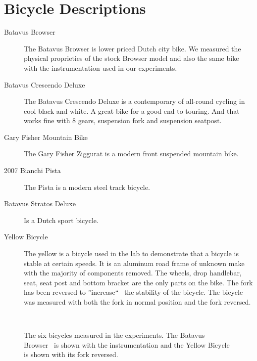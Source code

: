\documentclass{bmd2010p}
\begin{document}
\section{Bicycle Descriptions}
\begin{description}
    \item[Batavus Browser]{The Batavus Browser is lower priced Dutch city bike.
        We measured the physical proprieties of the stock Browser model and
        also the same bike with the instrumentation used in our experiments.}
    \item[Batavus Crescendo Deluxe]{The Batavus Crescendo Deluxe is a
        contemporary of all-round cycling in cool black and white. A great bike
        for a good end to touring. And that works fine with 8 gears, suspension
        fork and suspension seatpost.}
    \item[Gary Fisher Mountain Bike]{The Gary Fisher Ziggurat is a modern front
        suspended mountain bike.}
    \item[2007 Bianchi Pista]{The Pista is a modern steel track bicycle.}
    \item[Batavus Stratos Deluxe]{Is a Dutch sport bicycle.}
    \item[Yellow Bicycle]{The yellow is a bicycle used in the lab to
        demonstrate that a bicycle is stable at certain speeds. It is an
        aluminum road frame of unknown make with the majority of components
        removed. The wheels, drop handlebar, seat, seat post and bottom bracket
        are the only parts on the bike. The fork has been reversed to
        ''increase``~\cite{Kooijman2006} the stability of the bicycle. The
        bicycle was measured with both the fork in normal position and the fork
        reversed.}
\end{description}
\begin{figure}[htbp]
    \centering
        \\
    \caption{The six bicycles measured in the experiments. The Batavus
    Browser~ is shown with the instrumentation and the
    Yellow Bicycle~ is shown with its fork reversed.}
    \label{fig:bicycles}
\end{figure}
\end{document}
